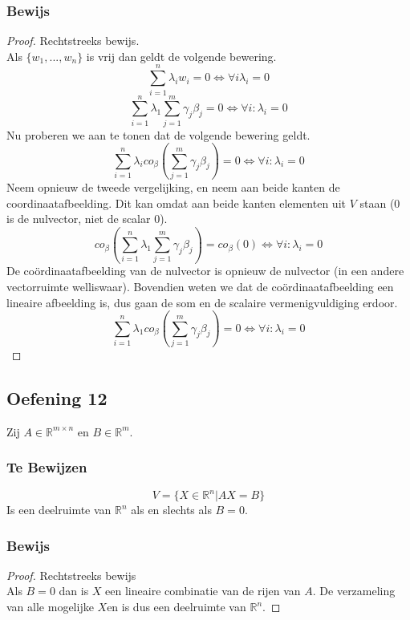 \documentclass[lineaire_algebra_oplossingen.tex]{subfiles}
\begin{document}
\subsubsection*{Bewijs}
\begin{proof}
Rechtstreeks bewijs.\\
Als $\{w_1,...,w_n\}$ is vrij dan geldt de volgende bewering.
\[\sum_{i=1}^n\lambda_iw_i = 0 \Leftrightarrow \forall i \lambda_i = 0\]
\[
\sum_{i=1}^n \lambda_1\sum_{j=1}^m\gamma_j\beta_j = 0 \Leftrightarrow \forall i:\lambda_i=0
\]
Nu proberen we aan te tonen dat de volgende bewering geldt.
\[
\sum_{i=1}^n \lambda_i co_\beta\left(\sum_{j=1}^m\gamma_j\beta_j\right) = 0 \Leftrightarrow \forall i:\lambda_i=0
\]
Neem opnieuw de tweede vergelijking, en neem aan beide kanten de coordinaatafbeelding. Dit kan omdat aan beide kanten elementen uit $V$ staan ($0$ is de nulvector, niet de scalar $0$).
\[
co_{\beta}\left(\sum_{i=1}^n \lambda_1\sum_{j=1}^m\gamma_j\beta_j\right) = co_{\beta}(0) \Leftrightarrow \forall i:\lambda_i=0
\]
De co\"ordinaatafbeelding van de nulvector is opnieuw de nulvector (in een andere vectorruimte welliswaar). Bovendien weten we dat de co\"ordinaatafbeelding een lineaire afbeelding is, dus gaan de som en de scalaire vermenigvuldiging erdoor.
\[
\sum_{i=1}^n \lambda_1 co_{\beta}\left(\sum_{j=1}^m\gamma_j\beta_j\right) = 0 \Leftrightarrow \forall i:\lambda_i=0
\]
\end{proof}

\subsection{Oefening 12}
Zij $A \in \mathbb{R}^{m\times n}$ en $B \in \mathbb{R}^m$.
\subsubsection*{Te Bewijzen}
\[
V = \{ X \in \mathbb{R}^n | AX = B\}
\]
Is een deelruimte van $\mathbb{R}^n$ als en slechts als $B=0$.
\subsubsection*{Bewijs}
\begin{proof}
Rechtstreeks bewijs\\
Als $B=0$ dan is $X$ een lineaire combinatie van de rijen van $A$. De verzameling van alle mogelijke $X$en is dus een deelruimte van $\mathbb{R}^n$.
\end{proof}
\end{document}
